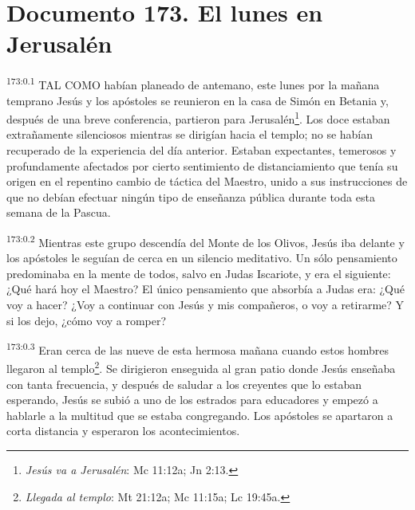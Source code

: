 \chapter{Documento 173. El lunes en Jerusalén}
\par
\textsuperscript{173:0.1} TAL COMO habían planeado de antemano, este lunes por la mañana temprano Jesús y los apóstoles se reunieron en la casa de Simón en Betania y, después de una breve conferencia, partieron para Jerusalén\footnote{\textit{Jesús va a Jerusalén}: Mc 11:12a; Jn 2:13.}. Los doce estaban extrañamente silenciosos mientras se dirigían hacia el templo; no se habían recuperado de la experiencia del día anterior. Estaban expectantes, temerosos y profundamente afectados por cierto sentimiento de distanciamiento que tenía su origen en el repentino cambio de táctica del Maestro, unido a sus instrucciones de que no debían efectuar ningún tipo de enseñanza pública durante toda esta semana de la Pascua.

\par
\textsuperscript{173:0.2} Mientras este grupo descendía del Monte de los Olivos, Jesús iba delante y los apóstoles le seguían de cerca en un silencio meditativo. Un sólo pensamiento predominaba en la mente de todos, salvo en Judas Iscariote, y era el siguiente: ¿Qué hará hoy el Maestro? El único pensamiento que absorbía a Judas era: ¿Qué voy a hacer? ¿Voy a continuar con Jesús y mis compañeros, o voy a retirarme? Y si los dejo, ¿cómo voy a romper?

\par
\textsuperscript{173:0.3} Eran cerca de las nueve de esta hermosa mañana cuando estos hombres llegaron al templo\footnote{\textit{Llegada al templo}: Mt 21:12a; Mc 11:15a; Lc 19:45a.}. Se dirigieron enseguida al gran patio donde Jesús enseñaba con tanta frecuencia, y después de saludar a los creyentes que lo estaban esperando, Jesús se subió a uno de los estrados para educadores y empezó a hablarle a la multitud que se estaba congregando. Los apóstoles se apartaron a corta distancia y esperaron los acontecimientos.

